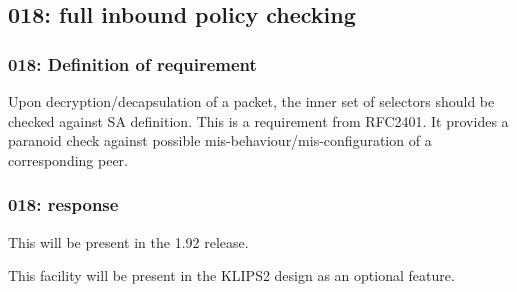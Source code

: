 \subsection{018: full inbound policy checking}

\subsubsection{018: Definition of requirement }

Upon decryption/decapsulation of a packet, the inner set of selectors should
be checked against SA definition. This is a requirement from RFC2401. It
provides a paranoid check against possible mis-behaviour/mis-configuration of
a corresponding peer.

\subsubsection{018: response}

This will be present in the 1.92 release.

This facility will be present in the KLIPS2 design as an optional feature.

